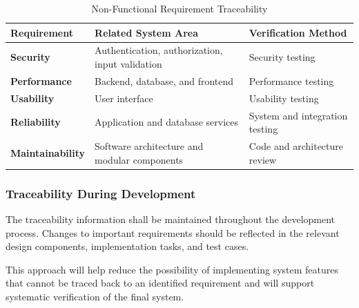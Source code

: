 \begin{table}[H]
\centering
\small

\begin{tabularx}{\textwidth}{>{\bfseries}l X X}
\toprule
Requirement & Related System Area & Verification Method \\
\midrule

Security &
Authentication, authorization, input validation &
Security testing \\

Performance &
Backend, database, and frontend &
Performance testing \\

Usability &
User interface &
Usability testing \\

Reliability &
Application and database services &
System and integration testing \\

Maintainability &
Software architecture and modular components &
Code and architecture review \\

\bottomrule
\end{tabularx}

\caption{Non-Functional Requirement Traceability}
\label{tab:nonfunctional_traceability}

\end{table}

\subsubsection{Traceability During Development}

The traceability information shall be maintained throughout the
development process. Changes to important requirements should be
reflected in the relevant design components, implementation tasks, and
test cases.

This approach will help reduce the possibility of implementing system
features that cannot be traced back to an identified requirement and
will support systematic verification of the final system.